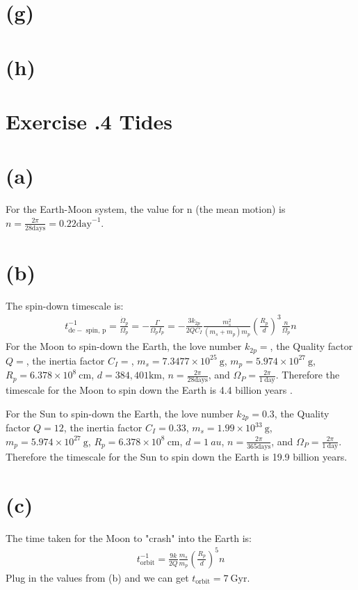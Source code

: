 \documentclass[a4paper,12pt]{article}
\newcommand{\cm}{\mathrm{cm}}
\newcommand{\g}{\mathrm{g}}
\begin{document}
\section*{(g)}

\section*{(h)}


\section*{\textbf{Exercise \uppercase\expandafter{}.4 Tides}}
\section*{(a)}
For the Earth-Moon system, the value for n (the mean motion) is $n = \frac{2\pi}{28 \text{days}} = 0.22 \text{day}^{-1}$.

\section*{(b)}
The spin-down timescale is:
\begin{align*}
    t_{\mathrm{de}-\text { spin, } \mathrm{p}}^{-1}=\frac{\dot{\Omega}_p}{\Omega_p}=-\frac{\Gamma}{\Omega_p I_p}=-\frac{3 k_{2 p}}{2 Q C_I} \frac{m_s^2}{\left(m_s+m_p\right) m_p}\left(\frac{R_p}{d}\right)^3 \frac{n}{\Omega_p} n
\end{align*}
For the Moon to spin-down the Earth, the love number $k_{2p} = $, the Quality factor $Q = $, 
the inertia factor $C_I = $, $m_s = 7.3477\times 10^{25} \ \g$, $m_p =5.974\times 10^{27} \ \g $, $R_p = 6.378\times 10^8 \ \cm$, $d = 384,401 \text{km}$, $n = \frac{2\pi}{28 \text{days}}$, and $\Omega_P = \frac{2\pi}{1 \ \text{day}}$. 
Therefore the timescale for the Moon to spin down the Earth is 4.4 billion years .

For the Sun to spin-down the Earth, the love number $k_{2p} = 0.3$, the Quality factor $Q = 12$, 
the inertia factor $C_I = 0.33$, $m_s = 1.99\times 10^{33}\ \g$, $m_p =5.974\times 10^{27} \ \g $, $R_p = 6.378\times 10^8 \ \cm$, $d = 1 \ au$, $n = \frac{2\pi}{365 \text{days}}$, and $\Omega_P = \frac{2\pi}{1 \ \text{day}}$.
Therefore the timescale for the Sun to spin down the Earth is 19.9 billion years.

\section*{(c)}
The time taken for the Moon to "crash" into the Earth is:
\begin{align*}
    t_{\text{orbit}}^{-1} = \frac{9k}{2Q} \frac{m_s}{m_p} (\frac{R_p}{d})^5 n
\end{align*}
Plug in the values from (b) and we can get $t_{\text{orbit}} = 7 \ \text{Gyr}$.
\end{document}
